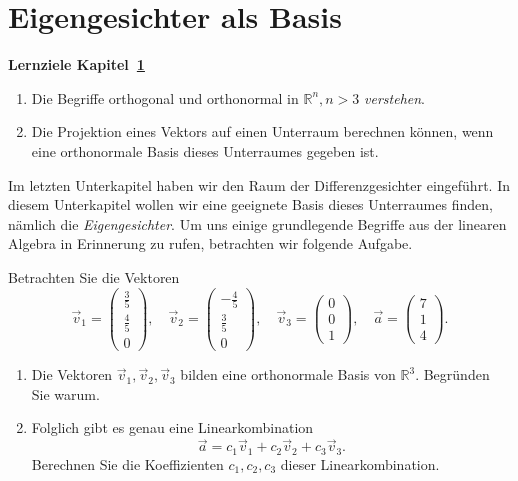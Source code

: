 \section{Eigengesichter als Basis} \label{sec:eigenbasis}
\begin{tcolorbox}
	\centerline{\textbf{Lernziele Kapitel~\ref{sec:eigenbasis}}}
	\begin{enumerate}[leftmargin=*,label=\thesection.\arabic*]
		\item Die Begriffe \glqq{}orthogonal\grqq{} und \glqq{}orthonormal\grqq{} in $\mathbb R^n,n>3$ \textit{verstehen}.
		\item Die Projektion eines Vektors auf einen Unterraum berechnen können, wenn eine orthonormale Basis dieses Unterraumes gegeben ist.
	\end{enumerate}
\end{tcolorbox}
Im letzten Unterkapitel haben wir den Raum der Differenzgesichter eingeführt.
In diesem Unterkapitel wollen wir eine geeignete Basis dieses Unterraumes finden, nämlich die \textit{Eigengesichter}.
Um uns einige grundlegende Begriffe aus der linearen Algebra in Erinnerung zu rufen, betrachten wir folgende Aufgabe.
\begin{aufgabe}
	Betrachten Sie die Vektoren
	\begin{equation*}
		\vec v_1=\begin{pmatrix}
			\tfrac{3}{5} \\ \tfrac{4}{5} \\ 0
		\end{pmatrix},\quad
		\vec v_2=\begin{pmatrix}
			-\tfrac{4}{5} \\ \tfrac{3}{5} \\  0
		\end{pmatrix},\quad
		\vec v_3=\begin{pmatrix}
			0 \\ 0 \\  1
		\end{pmatrix},\quad
		\vec a=\begin{pmatrix}
			7 \\ 1 \\  4
		\end{pmatrix}.
	\end{equation*}
	\begin{enumerate}[label=(\alph*)]
		\item Die Vektoren $\vec v_1,\vec v_2,\vec v_3$ bilden eine orthonormale Basis von $\mathbb R^3$.
		Begründen Sie warum.
		\item Folglich gibt es genau eine Linearkombination
		\begin{equation*}
			\vec a=c_1\vec v_1+c_2\vec v_2+c_3\vec v_3.
		\end{equation*}
		Berechnen Sie die Koeffizienten $c_1,c_2,c_3$ dieser Linearkombination.
	\end{enumerate}
\end{aufgabe}
